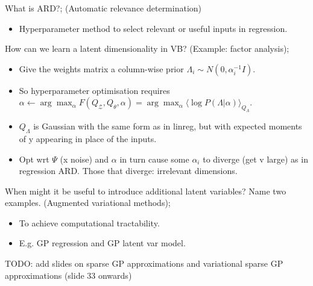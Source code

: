 \documentclass{article}
\begin{document}
What is ARD?; (Automatic relevance determination) \begin{itemize}
    \item Hyperparameter method to select relevant or useful inputs in regression.
\end{itemize} 

How can we learn a latent dimensionality in VB? (Example: factor analysis); \begin{itemize}
    \item Give the weights matrix a column-wise prior $\Lambda_i \sim N(0, \alpha_i^{-1}I)$.
    \item So hyperparameter optimisation requires $\alpha \leftarrow \arg\max_{\alpha} F(Q_\mathcal{Z}, Q_\theta, \alpha) = \arg\max_\alpha \langle \log P(\Lambda |\alpha)\rangle_{Q_\Lambda}$.
    \item $Q_\Lambda$ is Gaussian with the same form as in linreg, but with expected moments of y appearing in place of the inputs.
    \item Opt wrt $\Psi$ (x noise) and $\alpha$ in turn cause some $\alpha_i$ to diverge (get v large) as in regression ARD. Those that diverge: irrelevant dimensions.
\end{itemize}

When might it be useful to introduce additional latent variables? Name two examples. (Augmented variational methods); \begin{itemize}
    \item To achieve computational tractability.
    \item E.g. GP regression and GP latent var model.
\end{itemize}

TODO: add slides on sparse GP approximations and variational sparse GP approximations (slide 33 onwards)
\end{document}
